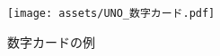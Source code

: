 \documentclass[11pt]{ltjsarticle}
\begin{document}
\begin{figure}[h]
  \begin{center}
    \texttt{[image: assets/UNO\_数字カード.pdf]}
    \caption{数字カードの例}
    \label{fig:数字カードの例}
  \end{center}
\end{figure}
\end{document}
